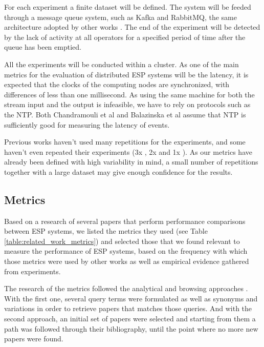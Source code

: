 \documentclass[ppgc,diss,english]{iiufrgs}
\begin{document}

For each experiment a finite dataset will be defined. The system will be feeded through a message queue system, such as Kafka and RabbitMQ, the same architecture adopted by other works \cite{chardonnens2013big, lim2013execution, wang2013cluster, sawant2013big}. The end of the experiment will be detected by the lack of activity at all operators for a specified period of time after the queue has been emptied.

All the experiments will be conducted within a cluster. As one of the main metrics for the evaluation of distributed ESP systems will be the latency, it is expected that the clocks of the computing nodes are synchronized, with differences of less than one millisecond. As using the same machine for both the stream input and the output is infeasible, we have to rely on protocols such as the NTP. Both Chandramouli et al \cite{chandramouli2011accurate} and Balazinska et al \cite{balazinska2008fault} assume that NTP is sufficiently good for measuring the latency of events.

Previous works haven't used many repetitions for the experiments, and some haven't even repeated their experiments (3x \cite{dayarathna2013performance}, 2x \cite{mendes2009performance} and 1x \cite{de2011watershed}). As our metrics have already been defined with high variability in mind, a small number of repetitions together with a large dataset may give enough confidence for the results.

\subsection{Metrics}

Based on a research of several papers that perform performance comparisons between ESP systems, we listed the metrics they used (see Table \ref{table:related_work_metrics}) and selected those that we found relevant to measure the performance of ESP systems, based on the frequency with which those metrics were used by other works as well as empirical evidence gathered from experiments.

The research of the metrics followed the analytical and browsing approaches \cite{best2014systematically}. With the first one, several query terms were formulated as well as synonyms and variations in order to retrieve papers that matches those queries. And with the second approach, an initial set of papers were selected and starting from them a path was followed through their bibliography, until the point where no more new papers were found.
\end{document}
